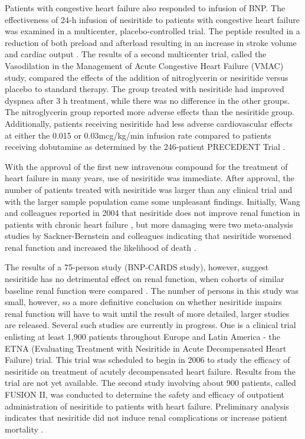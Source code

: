 \documentclass[14pt,a4paper,onecolumn]{extarticle}
\begin{document}
Patients with congestive heart failure also responded to infusion of BNP.  The effectiveness of 24-h infusion of nesiritide to patients with congestive heart failure was examined in a multicenter, placebo-controlled trial. The peptide resulted in a reduction of both preload and afterload resulting in an increase in stroke volume and cardiac output \citep{Mills1999}.
The results of a second multicenter trial, called the Vasodilation in the Management of Acute Congestive Heart Failure (VMAC) study, compared the effects of the addition of nitroglycerin or nesiritide versus placebo to standard therapy. The group treated with nesiritide had improved dyspnea after 3 h treatment, while there was no difference in the other groups. The nitroglycerin group reported more adverse effects than the nesiritide group. Additionally, patients receiving nesiritide had less adverse cardiovascular effects at either the 0.015 or 0.03mcg/kg/min infusion rate compared to patients receiving dobutamine as determined by the 246-patient PRECEDENT Trial \citep{deLissovoy2003}.  %

With the approval of the first new intravenous compound for the treatment of heart failure in many years, use of nesiritide was immediate. After approval, the number of patients treated with nesiritide was larger than any clinical trial and with the larger sample population came some unpleasant findings. Initially, Wang and colleagues reported in 2004 that nesiritide does not improve renal function in patients with chronic heart failure \citep{Wang2004}, but more damaging were two meta-analysis studies by Sackner-Bernstein and colleagues indicating that nesiritide worsened renal function and increased the likelihood of death \citep{Sackner-Bernstein2005a} \citep{Sackner-Bernstein2005b}. %

The results of a 75-person study (BNP-CARDS study), however, suggest nesiritide has no detrimental effect on renal function, when cohorts of similar baseline renal function were compared \citep{Witteles2007}. The number of persons in this study was small, however, so a more definitive conclusion on whether nesiritide impairs renal function will have to wait until the result of more detailed, larger studies are released. Several such studies are currently in progress. One is a clinical trial enlisting at least 1,900 patients throughout Europe and Latin America - the ETNA (Evaluating Treatment with Nesiritide in Acute Decompensated Heart Failure) trial.
This trial was scheduled to begin in 2006 to study the efficacy of nesiritide on treatment of acutely decompensated heart failure. Results from the trial are not yet available. The second study involving about 900 patients, called FUSION II, was conducted to determine the safety and efficacy of outpatient administration of nesiritide to patients with heart failure. Preliminary analysis indicates that nesiritide did not induce renal complications or increase patient mortality \citep{Cleland2007}. %
\end{document}
